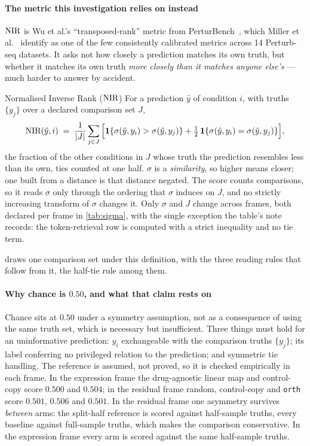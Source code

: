 \paragraph{The metric this investigation relies on instead} $\textrm{NIR}$ is Wu
et al.'s ``transposed-rank'' metric from PerturBench~\cite{perturbench}, which
Miller et al.~\cite{miller} identify as one of the few consistently calibrated
metrics across 14 Perturb-seq datasets. It asks not how closely a prediction
matches its own truth, but whether it matches its own truth \emph{more closely
than it matches anyone else's} --- much harder to answer by accident.

\begin{defn}{Normalised Inverse Rank ($\textrm{NIR}$)}
For a prediction $\hat y$ of condition $i$, with truths $\{y_j\}$ over a declared
comparison set $J$,
\begin{equation}
 \textrm{NIR}(\hat{y}, i) \;=\; \frac{1}{|J|}\sum_{j \in J}
 \Big[\mathbf{1}\{\sigma(\hat{y}, y_i) > \sigma(\hat{y}, y_j)\}
 + \tfrac{1}{2}\,\mathbf{1}\{\sigma(\hat{y}, y_i) = \sigma(\hat{y}, y_j)\}\Big],
\end{equation}
the fraction of the other conditions in $J$ whose truth the prediction resembles
less than its own, ties counted at one half. $\sigma$ is a \emph{similarity}, so
higher means closer; one built from a distance is that distance negated. The
score counts comparisons, so it reads $\sigma$ only through the ordering that
$\sigma$ induces on $J$, and no strictly increasing transform of $\sigma$ changes
it. Only $\sigma$ and $J$ change across frames, both declared per frame in
\cref{tab:sigma}, with the single exception the table's note records: the
token-retrieval row is computed with a strict inequality and no tie term.
\end{defn}

 draws one comparison set under this definition, with the three
reading rules that follow from it, the half-tie rule among them.



\paragraph{Why chance is $0.50$, and what that claim rests on} Chance sits at
$0.50$ under a symmetry assumption, not as a consequence of using the same truth
set, which is necessary but insufficient. Three things must hold for an
uninformative prediction: $y_i$ exchangeable with the comparison truths
$\{y_j\}$; its label conferring no privileged relation to the prediction; and
symmetric tie handling. The reference is assumed, not proved, so it is checked
empirically in each frame. In the expression frame the drug-agnostic linear map
and control-copy score $0.500$ and $0.504$; in the residual frame random,
control-copy and \texttt{orth} score $0.501$, $0.506$ and $0.501$. In the
residual frame one asymmetry survives \emph{between} arms: the split-half
reference is scored against half-sample truths, every baseline against
full-sample truths, which makes the comparison conservative. In the expression frame every
arm is scored against the same half-sample truths.


